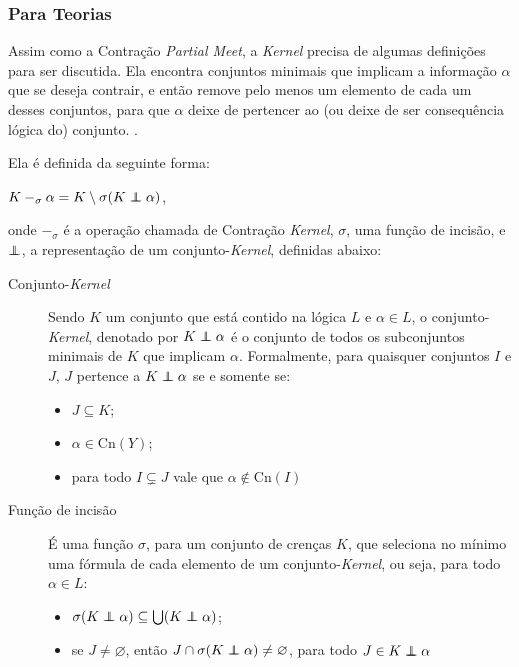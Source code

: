 \subsubsection{Para Teorias}

Assim como a Contração \textit{Partial Meet}, a \textit{Kernel} precisa de algumas definições para ser discutida. Ela encontra conjuntos minimais que implicam a informação $ \alpha $ que se deseja contrair, e então remove pelo menos um elemento de cada um desses conjuntos, para que $ \alpha $ deixe de pertencer ao (ou deixe de ser consequência lógica do) conjunto. \cite{revisaoCobe}. 

Ela é definida da seguinte forma:

\begin{center}
	$ K -_{\sigma} \alpha = K \setminus \sigma(K \kcont \alpha) $,
\end{center}

onde $ -_{\sigma} $ é a operação chamada de Contração \textit{Kernel}, $ \sigma $, uma função de incisão, e $ \kcont $, a representação de um conjunto-\textit{Kernel}, definidas abaixo:

\begin{description}
	\item[Conjunto-\textit{Kernel}] Sendo $ K $ um conjunto que está contido na lógica $ L $ e $ \alpha \in L $, o conjunto-\textit{Kernel}, denotado por $ K \kcont \alpha $ é o conjunto de todos os subconjuntos minimais de $ K $ que implicam $ \alpha $. Formalmente, para quaisquer conjuntos $ I $ e $ J $, $ J $ pertence a $ K \kcont \alpha $ se e somente se:
	\begin{itemize}
		\item $ J \subseteq K $;
		\item $ \alpha \in \text{Cn}(Y) $;
		\item para todo $ I \subsetneq J $ vale que $ \alpha \notin \text{Cn}(I) $
	\end{itemize} 	
	\item[Função de incisão] É uma função $ \sigma $, para um conjunto de crenças $ K $, que seleciona no mínimo uma fórmula de cada elemento de um conjunto-\textit{Kernel}, ou seja, para todo $ \alpha \in L $:
	\begin{itemize}
		\item $ \sigma (K \kcont \alpha) \subseteq \bigcup(K \kcont \alpha) $;
		\item se $ J \neq \varnothing $, então $ J \cap \sigma(K \kcont \alpha) \neq \varnothing $, para todo $ J \in K \kcont \alpha $
	\end{itemize}
\end{description}

